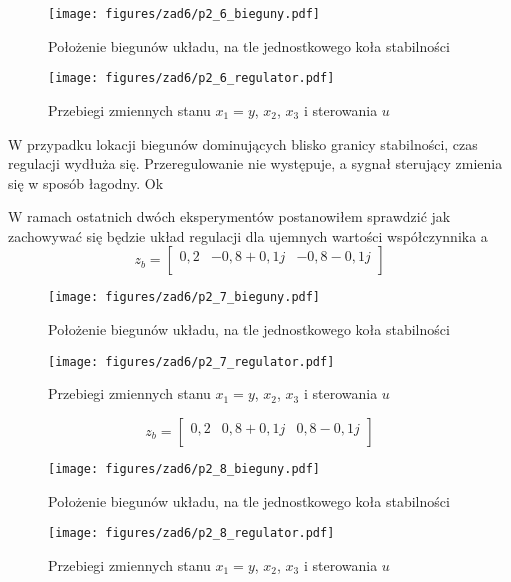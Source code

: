 \documentclass[a4paper,titlepage,11pt,floatssmall]{mwrep}
\begin{document}
\begin{figure}[H]
\centering
\texttt{[image: figures/zad6/p2\_6\_bieguny.pdf]}
\caption{Położenie biegunów układu, na tle jednostkowego koła stabilności}
\end{figure} 

\begin{figure}[H]
\centering
\texttt{[image: figures/zad6/p2\_6\_regulator.pdf]}
\caption{Przebiegi zmiennych stanu $x_1 = y$, $x_2$, $x_3$ i sterowania $u$}
\end{figure}
W przypadku lokacji biegunów dominujących blisko granicy stabilności, czas regulacji wydłuża się. Przeregulowanie nie występuje, a sygnał sterujący zmienia się w sposób łagodny. Ok

\newpage

\indent W ramach ostatnich dwóch eksperymentów postanowiłem sprawdzić jak zachowywać się będzie układ regulacji dla ujemnych wartości współczynnika a 
\[
z_b = 
\begin{bmatrix}
    0,2  &  -0,8 + 0,1j  & -0,8 - 0,1j    \\     
\end{bmatrix}
\]

\begin{figure}[H]
\centering
\texttt{[image: figures/zad6/p2\_7\_bieguny.pdf]}
\caption{Położenie biegunów układu, na tle jednostkowego koła stabilności}
\end{figure} 

\begin{figure}[H]
\centering
\texttt{[image: figures/zad6/p2\_7\_regulator.pdf]}
\caption{Przebiegi zmiennych stanu $x_1 = y$, $x_2$, $x_3$ i sterowania $u$}
\end{figure}

\newpage

\[
z_b = 
\begin{bmatrix}
    0,2  &  0,8 + 0,1j  & 0,8 - 0,1j    \\     
\end{bmatrix}
\]

\begin{figure}[H]
\centering
\texttt{[image: figures/zad6/p2\_8\_bieguny.pdf]}
\caption{Położenie biegunów układu, na tle jednostkowego koła stabilności}
\end{figure} 

\begin{figure}[H]
\centering
\texttt{[image: figures/zad6/p2\_8\_regulator.pdf]}
\caption{Przebiegi zmiennych stanu $x_1 = y$, $x_2$, $x_3$ i sterowania $u$}
\end{figure}
\end{document}
